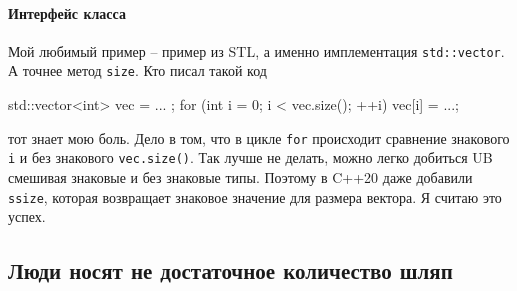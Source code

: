 \paragraph{Интерфейс класса}

Мой любимый пример -- пример из STL, а именно имплементация \verb"std::vector".
А точнее метод \verb"size".
Кто писал такой код
\begin{cppcode}
std::vector<int> vec = { ... };
for (int i = 0; i < vec.size(); ++i)
  vec[i] = ...;
\end{cppcode}
тот знает мою боль.
Дело в том, что в цикле \verb"for" происходит сравнение знакового \verb"i" и без знакового \verb"vec.size()".
Так лучше не делать, можно легко добиться UB смешивая знаковые и без знаковые типы.
Поэтому в C++20 даже добавили \verb"ssize", которая возвращает знаковое значение для размера вектора.
Я считаю это успех.

\subsection{Люди носят не достаточное количество шляп}
\label{section::NotEnoughHats}

